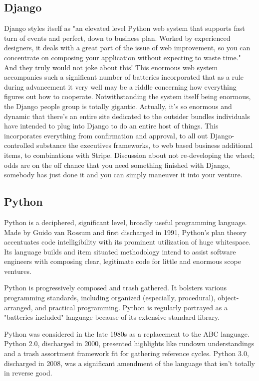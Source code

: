 \documentclass[oneside,12pt]{Classes/VTU}
\begin{document}
	\subsection{Django}
	Django styles itself as "an elevated level Python web system that supports fast turn of events and perfect, down to business plan. Worked by experienced designers, it deals with a great part of the issue of web improvement, so you can concentrate on composing your application without expecting to waste time." And they truly would not joke about this! This enormous web system accompanies such a significant number of batteries incorporated that as a rule during advancement it very well may be a riddle concerning how everything figures out how to cooperate. Notwithstanding the system itself being enormous, the Django people group is totally gigantic. Actually, it's so enormous and dynamic that there's an entire site dedicated to the outsider bundles individuals have intended to plug into Django to do an entire host of things. This incorporates everything from confirmation and approval, to all out Django-controlled substance the executives frameworks, to web based business additional items, to combinations with Stripe. Discussion about not re-developing the wheel; odds are on the off chance that you need something finished with Django, somebody has just done it and you can simply maneuver it into your venture.
	\subsection{Python}
	Python is a deciphered, significant level, broadly useful programming language. Made by Guido van Rossum and first discharged in 1991, Python's plan theory accentuates code intelligibility with its prominent utilization of huge whitespace. Its language builds and item situated methodology intend to assist software engineers with composing clear, legitimate code for little and enormous scope ventures. 

Python is progressively composed and trash gathered. It bolsters various programming standards, including organized (especially, procedural), object-arranged, and practical programming. Python is regularly portrayed as a "batteries included" language because of its extensive standard library. 

Python was considered in the late 1980s as a replacement to the ABC language. Python 2.0, discharged in 2000, presented highlights like rundown understandings and a trash assortment framework fit for gathering reference cycles. Python 3.0, discharged in 2008, was a significant amendment of the language that isn't totally in reverse good.
\end{document}
